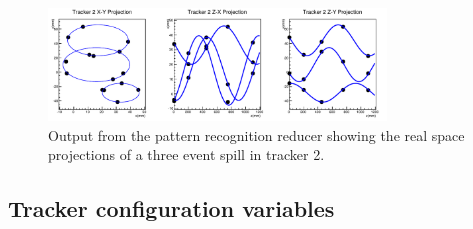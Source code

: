 \begin{figure}[htb]
  \begin{center}
    \includegraphics[width=0.8\textwidth]{detectors/tracker/06-CodeDesign/Figures/xyzPlotterOutput.pdf}
  \end{center}
  \caption{Output from the pattern recognition reducer showing the real space projections of a three event spill in tracker 2.}
  \label{Fig:SciFiReducerXYZ}
\end{figure}

\subsection{Tracker configuration variables}

